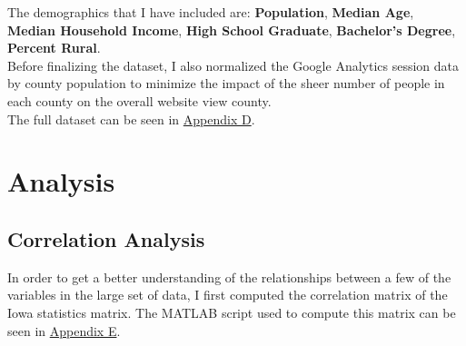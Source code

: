\documentclass[11pt]{article}
\begin{document}
\begin{multicols}{2}
The demographics that I have included are: \textbf{Population}, \textbf{Median Age}, \textbf{Median Household Income}, \textbf{High School Graduate}, \textbf{Bachelor's Degree}, \textbf{Percent Rural}.\\  

Before finalizing the dataset, I also normalized the Google Analytics session data by county population to minimize the impact of the sheer number of people in each county on the overall website view county. \\

The full dataset can be seen in \underline{Appendix D}.

\section{Analysis}

\subsection{Correlation Analysis}

In order to get a better understanding of the relationships between a few of the variables in the large set of data, I first computed the correlation matrix of the Iowa statistics matrix. The MATLAB script used to compute this matrix can be seen in \underline{Appendix E}.

\end{multicols}
\end{document}
